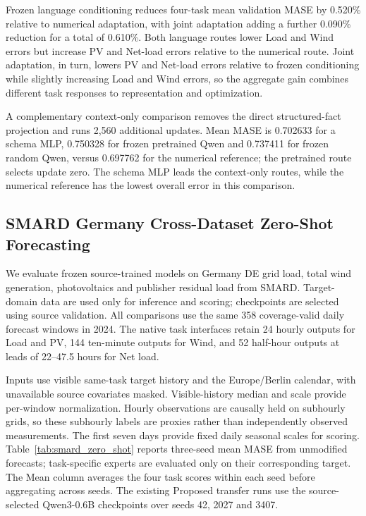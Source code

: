 \documentclass[journal]{IEEEtran}
\begin{document}
Frozen language conditioning reduces four-task mean validation MASE by 0.520\% relative to numerical adaptation, with joint adaptation adding a further 0.090\% reduction for a total of 0.610\%. Both language routes lower Load and Wind errors but increase PV and Net-load errors relative to the numerical route. Joint adaptation, in turn, lowers PV and Net-load errors relative to frozen conditioning while slightly increasing Load and Wind errors, so the aggregate gain combines different task responses to representation and optimization.

A complementary context-only comparison removes the direct structured-fact projection and runs 2,560 additional updates. Mean MASE is 0.702633 for a schema MLP, 0.750328 for frozen pretrained Qwen and 0.737411 for frozen random Qwen, versus 0.697762 for the numerical reference; the pretrained route selects update zero. The schema MLP leads the context-only routes, while the numerical reference has the lowest overall error in this comparison.

\subsection{SMARD Germany Cross-Dataset Zero-Shot Forecasting}
\label{sec:smard_zero_shot}

We evaluate frozen source-trained models on Germany DE grid load, total wind generation, photovoltaics and publisher residual load from SMARD. Target-domain data are used only for inference and scoring; checkpoints are selected using source validation. All comparisons use the same 358 coverage-valid daily forecast windows in 2024. The native task interfaces retain 24 hourly outputs for Load and PV, 144 ten-minute outputs for Wind, and 52 half-hour outputs at leads of 22--47.5 hours for Net load.

Inputs use visible same-task target history and the Europe/Berlin calendar, with unavailable source covariates masked. Visible-history median and scale provide per-window normalization. Hourly observations are causally held on subhourly grids, so these subhourly labels are proxies rather than independently observed measurements. The first seven days provide fixed daily seasonal scales for scoring. Table~\ref{tab:smard_zero_shot} reports three-seed mean MASE from unmodified forecasts; task-specific experts are evaluated only on their corresponding target. The Mean column averages the four task scores within each seed before aggregating across seeds. The existing Proposed transfer runs use the source-selected Qwen3-0.6B checkpoints over seeds 42, 2027 and 3407.
\end{document}
